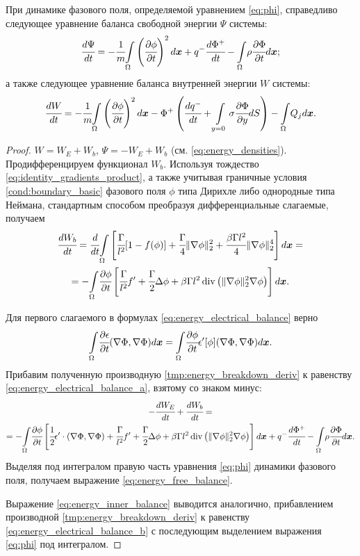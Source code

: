 \begin{proposition}
\label{prop:energy_balance}
При динамике фазового поля, определяемой уравнением \eqref{eq:phi}, справедливо следующее уравнение баланса свободной энергии $\Psi$ системы:
\begin{equation}
    \cfrac{d \Psi}{dt} = -\cfrac{1}{m} {\int\limits_\Omega} \left( \cfrac{\partial \phi}{\partial t} \right)^2 d {\boldsymbol{x}} + q^- \cfrac{d \Phi^+}{dt} - {\int\limits_\Omega} \rho \cfrac{\partial \Phi}{\partial t} d {\boldsymbol{x}};
    \label{eq:energy_free_balance}
\end{equation}
а также следующее уравнение баланса внутренней энергии $W$ системы:
\begin{equation}
    \cfrac{dW}{dt} = -\cfrac{1}{m} {\int\limits_\Omega} \left( \cfrac{\partial \phi}{\partial t} \right)^2 d {\boldsymbol{x}} - \Phi^+ \left( \cfrac{d q^-}{dt} + \int\limits_{y = 0} \sigma \cfrac{\partial \Phi}{\partial y} dS \right) - {\int\limits_\Omega} Q_j d {\boldsymbol{x}}.
    \label{eq:energy_inner_balance}
\end{equation}
\end{proposition}
\begin{proof}
$W = W_E + W_b$, $\Psi = -W_E + W_b$ (см. \eqref{eq:energy_densities}). Продифференцируем функционал $W_b$. Используя тождество \eqref{eq:identity_gradients_product}, а также учитывая граничные условия \eqref{cond:boundary_basic} фазового поля $\phi$ типа Дирихле либо однородные типа Неймана, стандартным способом преобразуя дифференциальные слагаемые, получаем
\begin{multline}
    \cfrac{d W_b}{dt} = \cfrac{d}{dt} {\int\limits_\Omega} \left[ \cfrac{\Gamma}{l^2}[1 - f(\phi)] + \cfrac{\Gamma}{4} \| \nabla \phi \|_2^2 + \cfrac{\beta \Gamma l^2}{4} \| \nabla \phi \|_2^4 \right] d {\boldsymbol{x}} = \\ = - {\int\limits_\Omega} \cfrac{\partial \phi}{\partial t} \left[ \cfrac{\Gamma}{l^2} f' + \cfrac{\Gamma}{2} \Delta \phi + \beta \Gamma l^2 \operatorname{{div}} \left( \| \nabla \phi \|_2^2 \nabla \phi \right) \right] d {\boldsymbol{x}}.
    \label{tmp:energy_breakdown_deriv}
\end{multline}

Для первого слагаемого в формулах \eqref{eq:energy_electrical_balance} верно
\[
    {\int\limits_\Omega} \cfrac{\partial \epsilon}{\partial t} (\nabla \Phi, \nabla \Phi) d {\boldsymbol{x}} = {\int\limits_\Omega} \cfrac{\partial \phi}{\partial t} \epsilon'[\phi] (\nabla \Phi, \nabla \Phi) d {\boldsymbol{x}}.
\]
Прибавим полученную производную \eqref{tmp:energy_breakdown_deriv} к равенству \eqref{eq:energy_electrical_balance_a}, взятому со знаком минус:
\begin{multline*}
    -\cfrac{d W_E}{dt} + \cfrac{d W_b}{dt} = \\ = -{\int\limits_\Omega} \cfrac{\partial \phi}{\partial t} \left[ \cfrac{1}{2} \epsilon' \cdot (\nabla \Phi, \nabla \Phi) + \cfrac{\Gamma}{l^2} f' + \cfrac{\Gamma}{2} \Delta \phi + \beta \Gamma l^2 \operatorname{{div}} \left( \| \nabla \phi \|_2^2 \nabla \phi \right) \right] d {\boldsymbol{x}} + q^- \cfrac{d \Phi^+}{dt} - {\int\limits_\Omega} \rho \cfrac{\partial \Phi}{\partial t} d {\boldsymbol{x}}.
\end{multline*}
Выделяя под интегралом правую часть уравнения \eqref{eq:phi} динамики фазового поля, получаем выражение \eqref{eq:energy_free_balance}.

Выражение \eqref{eq:energy_inner_balance} выводится аналогично, прибавлением производной \eqref{tmp:energy_breakdown_deriv} к равенству \eqref{eq:energy_electrical_balance_b} с последующим выделением выражения \eqref{eq:phi} под интегралом.
\end{proof}

